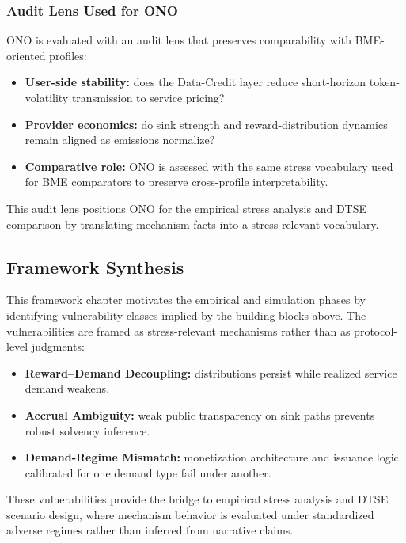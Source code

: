 \subsubsection{Audit Lens Used for ONO}
ONO is evaluated with an audit lens that preserves comparability with BME-oriented profiles:
\begin{itemize}
    \item \textbf{User-side stability:} does the Data-Credit layer reduce short-horizon token-volatility transmission to service pricing?
    \item \textbf{Provider economics:} do sink strength and reward-distribution dynamics remain aligned as emissions normalize?
    \item \textbf{Comparative role:} ONO is assessed with the same stress vocabulary used for BME comparators to preserve cross-profile interpretability.
\end{itemize}

This audit lens positions ONO for the empirical stress analysis and DTSE comparison by translating mechanism facts into a stress-relevant vocabulary.

\subsection{Framework Synthesis}
This framework chapter motivates the empirical and simulation phases by identifying vulnerability classes implied by the building blocks above. The vulnerabilities are framed as stress-relevant mechanisms rather than as protocol-level judgments:
\begin{itemize}
    \item \textbf{Reward--Demand Decoupling:} distributions persist while realized service demand weakens.
    \item \textbf{Accrual Ambiguity:} weak public transparency on sink paths prevents robust solvency inference.
    \item \textbf{Demand-Regime Mismatch:} monetization architecture and issuance logic calibrated for one demand type fail under another.
\end{itemize}

These vulnerabilities provide the bridge to empirical stress analysis and DTSE scenario design, where mechanism behavior is evaluated under standardized adverse regimes rather than inferred from narrative claims.

\ifincludeprovenance

\fi
